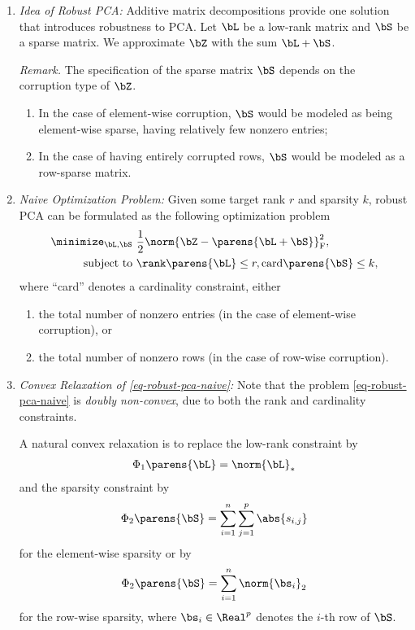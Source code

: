 \documentclass[12pt]{article}
\begin{document}
\begin{enumerate}[label=\textbf{\arabic*.}]
\begin{enumerate}
		\item \textit{Idea of Robust PCA:} Additive matrix decompositions provide one solution that introduces robustness to PCA. Let $\bL$ be a low-rank matrix and $\bS$ be a sparse matrix. We approximate $\bZ$ with the sum $\bL + \bS$. 
		
		\textit{Remark.} The specification of the sparse matrix $\bS$ depends on the corruption type of $\bZ$. 
		\begin{enumerate}
			\item In the case of element-wise corruption, $\bS$ would be modeled as being element-wise sparse, having relatively few nonzero entries; 
			\item In the case of having entirely corrupted rows, $\bS$ would be modeled as a row-sparse matrix. 
		\end{enumerate}
		
		\item \textit{Naive Optimization Problem:} Given some target rank $r$ and sparsity $k$, robust PCA can be formulated as the following optimization problem 
		\begin{equation}\label{eq-robust-pca-naive}
			\begin{aligned}
				\minimize_{\bL, \bS} & \ \frac{1}{2} \norm{\bZ - \parens{\bL + \bS}}_{\mathrm{F}}^2, \\ 
				\text{ subject to} & \ \rank \parens{\bL} \le r, \text{card} \parens{\bS} \le k, 
			\end{aligned}
		\end{equation}
		where ``card'' denotes a cardinality constraint, either 
		\begin{enumerate}
			\item the total number of nonzero entries (in the case of element-wise corruption), or 
			\item the total number of nonzero rows (in the case of row-wise corruption). 
		\end{enumerate}
		
		\item \textit{Convex Relaxation of \eqref{eq-robust-pca-naive}:} Note that the problem \eqref{eq-robust-pca-naive} is \emph{doubly non-convex}, due to both the rank and cardinality constraints. 
		
		A natural convex relaxation is to replace the low-rank constraint by 
		\begin{align*}
			\Phi_1 \parens{\bL} = \norm{\bL}_*
		\end{align*}
		and the sparsity constraint by 
		\begin{align*}
			\Phi_2 \parens{\bS} = \sum_{i=1}^n \sum_{j=1}^p \abs{s_{i,j}}
		\end{align*}
		for the element-wise sparsity or by 
		\begin{align*}
			\Phi_2 \parens{\bS} = \sum_{i=1}^n \norm{\bs_{i}}_2
		\end{align*}
		for the row-wise sparsity, where $\bs_i \in \Real^p$ denotes the $i$-th row of $\bS$. 
		

\end{enumerate}
\end{enumerate}
\end{document}
